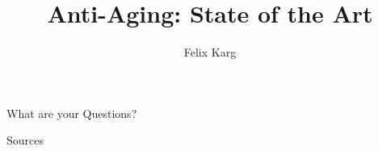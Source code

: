 \usepackage[ngerman, english]{babel}


\title{Anti-Aging: State of the Art}
\author{Felix Karg}


\graphicspath{ {./img/} {../template/} {../template_tex/} } %

\newif\iftwocols
\twocolsfalse





\newif\ifonline
\onlinefalse





% 
% 












\addtocounter{framenumber}{1}
\begin{frame}[standout]
    \LARGE
    What are your Questions?
\end{frame}


\appendix
\backupbegin

\begin{frame}{Sources}
% 

% 

\end{frame}


\backupend


